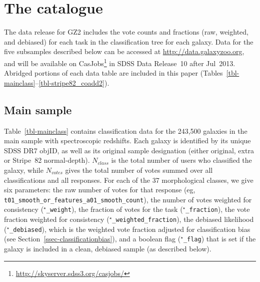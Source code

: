 \documentclass[useAMS,usenatbib]{mn2e}
\begin{document}

\section{The catalogue} \label{sec-catalogue}


The data release for GZ2 includes the vote counts and fractions (raw, weighted, and debiased) for each task in the classification tree for each galaxy. Data for the five subsamples described below can be accessed at \url{http://data.galaxyzoo.org}, and will be available on CasJobs\footnote{\url{http://skyserver.sdss3.org/casjobs/}} in SDSS Data Release~10 after Jul~2013. Abridged portions of each data table are included in this paper (Tables~\ref{tbl-mainclass}--\ref{tbl-stripe82_coadd2}).

\subsection{Main sample}\label{ssec-catalogue_main}

Table~\ref{tbl-mainclass} contains classification data for the 243,500 galaxies in the main sample with spectroscopic redshifts. Each galaxy is identified by its unique SDSS DR7 objID, as well as its original sample designation (either original, extra or Stripe~82 normal-depth). $N_{class}$ is the total number of users who classified the galaxy, while $N_{votes}$ gives the total number of votes summed over all classifications and all responses. For each of the 37 morphological classes, we give six parameters: the raw number of votes for that response (eg, {\tt t01\_smooth\_or\_features\_a01\_smooth\_count}), the number of votes weighted for consistency ({\tt $^\star$\_weight}), the fraction of votes for the task ({\tt $^\star$\_fraction}), the vote fraction weighted for consistency ({\tt $^\star$\_weighted\_fraction}), the debiased likelihood ({\tt $^\star$\_debiased}), which is the weighted vote fraction adjusted for classification bias (see Section~\ref{ssec-classificationbias}), and a boolean flag ({\tt $^\star$\_flag}) that is set if the galaxy is included in a clean, debiased sample (as described below).
\end{document}
